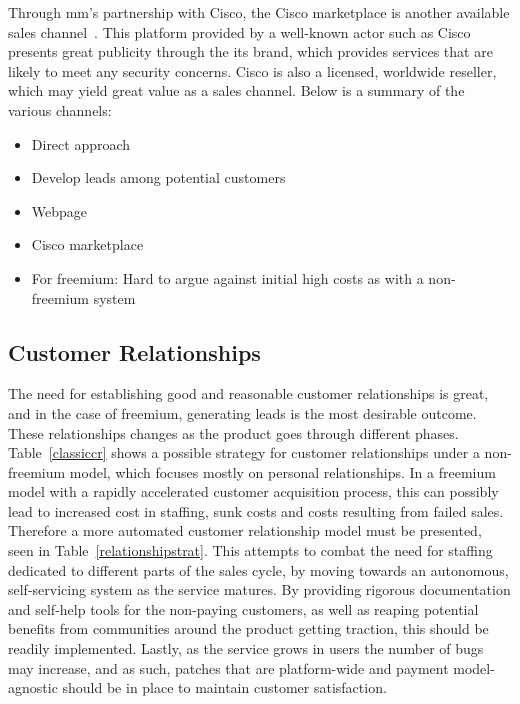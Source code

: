 Through \gls{mm}'s partnership with Cisco, the Cisco marketplace is another available sales channel~\cite{ciscomarket}. This platform provided by a well-known actor such as Cisco presents great publicity through the its brand, which provides services that are likely to meet any security concerns. Cisco is also a licensed, worldwide reseller, which may yield great value as a sales channel. Below is a summary of the various channels:


\begin{itemize}
    \item Direct approach
    \item Develop leads among potential customers
    \item Webpage
    \item Cisco marketplace
    \item For freemium: Hard to argue against initial high costs as with a non-freemium system
\end{itemize}

\subsection{Customer Relationships}
The need for establishing good and reasonable customer relationships is great, and in the case of freemium, generating leads is the most desirable outcome. These relationships changes as the product goes through different phases. Table~\ref{classiccr} shows a possible strategy for customer relationships under a non-freemium model, which focuses mostly on personal relationships. In a freemium model with a rapidly accelerated customer acquisition process, this can possibly lead to increased cost in staffing, sunk costs and costs resulting from failed sales. Therefore a more automated customer relationship model must be presented, seen in Table~\ref{relationshipstrat}. This attempts to combat the need for staffing dedicated to different parts of the sales cycle, by moving towards an autonomous, self-servicing system as the service matures. By providing rigorous documentation and self-help tools for the non-paying customers, as well as reaping potential benefits from communities around the product getting traction, this should be readily implemented. Lastly, as the service grows in users the number of bugs may increase, and as such, patches that are platform-wide and payment model-agnostic should be in place to maintain customer satisfaction.


